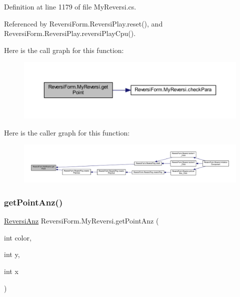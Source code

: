 Definition at line 1179 of file My\+Reversi.\+cs.



Referenced by Reversi\+Form.\+Reversi\+Play.\+reset(), and Reversi\+Form.\+Reversi\+Play.\+reversi\+Play\+Cpu().

Here is the call graph for this function\+:\nopagebreak
\begin{figure}[H]
\begin{center}
\leavevmode
\includegraphics[width=350pt]{class_reversi_form_1_1_my_reversi_a58150a220368d7d7ae8ad01ee0120e71_cgraph}
\end{center}
\end{figure}
Here is the caller graph for this function\+:\nopagebreak
\begin{figure}[H]
\begin{center}
\leavevmode
\includegraphics[width=350pt]{class_reversi_form_1_1_my_reversi_a58150a220368d7d7ae8ad01ee0120e71_icgraph}
\end{center}
\end{figure}
\mbox{\label{class_reversi_form_1_1_my_reversi_af0170bf211a996c2285d0db926f2f0ae}} 
\subsubsection{\texorpdfstring{get\+Point\+Anz()}{getPointAnz()}}
{\footnotesize\ttfamily \hyperlink{class_reversi_form_1_1_reversi_anz}{Reversi\+Anz} Reversi\+Form.\+My\+Reversi.\+get\+Point\+Anz (\begin{DoxyParamCaption}\item[{int}]{color,  }\item[{int}]{y,  }\item[{int}]{x }\end{DoxyParamCaption})}



